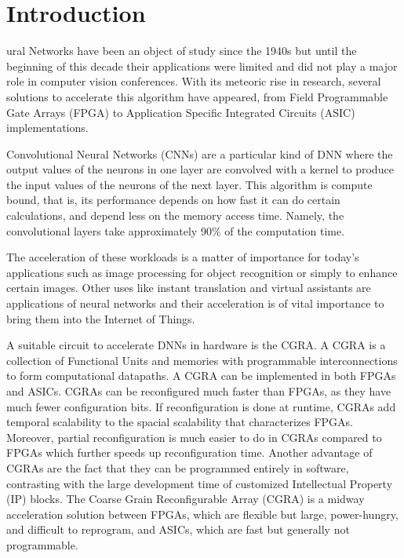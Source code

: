\documentclass[conference]{IEEEtran}
\begin{document}

\section{Introduction}
ural Networks have been an object of study since the 1940s but until the
beginning of this decade their applications were limited and did not play a
major role in computer vision conferences. With its meteoric rise in research,
several solutions to accelerate this algorithm have appeared, from Field Programmable Gate Arrays (FPGA) to
Application Specific Integrated Circuits (ASIC) implementations.

Convolutional Neural Networks (CNNs) are a particular kind of DNN where the output
values of the neurons in one layer are convolved with a kernel to produce the
input values of the neurons of the next layer. This algorithm is compute bound,
that is, its performance depends on how fast it can do certain calculations, and
depend less on the memory access time. Namely, the convolutional layers take
approximately 90$\%$ of the computation time.

The acceleration of these workloads is a matter of importance for today's
applications such as image processing for object recognition or simply to
enhance certain images. Other uses like instant translation and virtual
assistants are applications of neural networks and their acceleration is of
vital importance to bring them into the Internet of Things.

A suitable circuit to accelerate DNNs in hardware is the CGRA. A CGRA is a
collection of Functional Units and memories with programmable interconnections
to form computational datapaths. A CGRA can be implemented in both
FPGAs and ASICs. CGRAs can be reconfigured much faster than FPGAs, as they have
much fewer configuration bits. If reconfiguration is done at runtime, CGRAs add
temporal scalability to the spacial scalability that characterizes
FPGAs. Moreover, partial reconfiguration is much easier to do in CGRAs compared
to FPGAs which further speeds up reconfiguration time. Another advantage of
CGRAs are the fact that they can be programmed entirely in software, contrasting
with the large development time of customized Intellectual Property (IP) blocks.
The Coarse Grain Reconfigurable Array (CGRA) is a midway acceleration solution
between FPGAs, which are flexible but large, power-hungry, and difficult to
reprogram, and ASICs, which are fast but generally not programmable.
\end{document}
